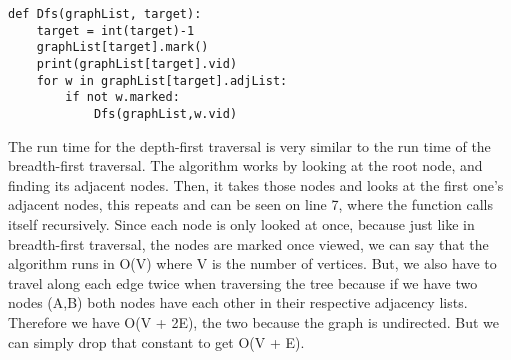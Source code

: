 \documentclass{article}
\begin{document}
\begin{lstlisting}
def Dfs(graphList, target):
    target = int(target)-1
    graphList[target].mark()
    print(graphList[target].vid)
    for w in graphList[target].adjList:
        if not w.marked:
            Dfs(graphList,w.vid)

\end{lstlisting}
\vspace{5mm}
The run time for the depth-first traversal is very similar to the run time of the breadth-first traversal. The algorithm works by looking at the root node, and finding its adjacent nodes. Then, it takes those nodes and looks at the first one's adjacent nodes, this repeats and can be seen on line 7, where the function calls itself recursively. Since each node is only looked at once, because just like in breadth-first traversal, the nodes are marked once viewed, we can say that the algorithm runs in O(V) where V is the number of vertices. But, we also have to travel along each edge twice when traversing the tree because if we have two nodes (A,B) both nodes have each other in their respective adjacency lists. Therefore we have O(V + 2E), the two because the graph is undirected. But we can simply drop that constant to get O(V + E). 
\end{document}
